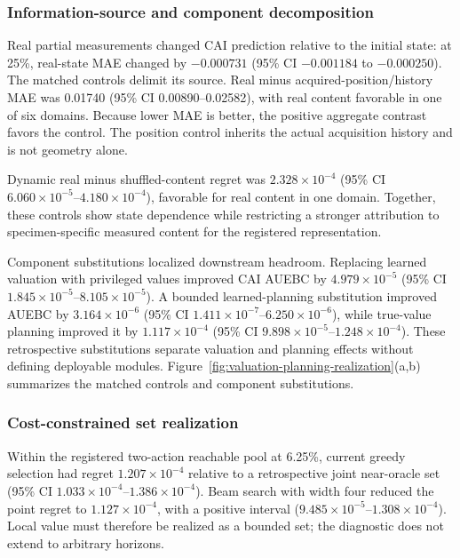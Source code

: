 \documentclass[preprint,12pt]{elsarticle}
\begin{document}
\subsubsection{Information-source and component decomposition}
\label{sec:results-decomposition}

Real partial measurements changed CAI prediction relative to the initial state:
at 25\%, real-state MAE changed by $-0.000731$ (95\% CI
$-0.001184$ to $-0.000250$). The matched controls delimit its source. Real
minus acquired-position/history MAE was 0.01740 (95\% CI 0.00890--0.02582),
with real content favorable in one of six domains. Because lower MAE is better,
the positive aggregate contrast favors the control. The position control
inherits the actual acquisition history and is not geometry alone.

Dynamic real minus shuffled-content regret was
$2.328\times10^{-4}$ (95\% CI
$6.060\times10^{-5}$--$4.180\times10^{-4}$), favorable for real content in one
domain. Together, these controls show state dependence while restricting a
stronger attribution to specimen-specific measured content for the registered
representation.

Component substitutions localized downstream headroom. Replacing learned
valuation with privileged values improved CAI AUEBC by
$4.979\times10^{-5}$ (95\% CI
$1.845\times10^{-5}$--$8.105\times10^{-5}$). A bounded learned-planning
substitution improved AUEBC by $3.164\times10^{-6}$ (95\% CI
$1.411\times10^{-7}$--$6.250\times10^{-6}$), while true-value planning
improved it by $1.117\times10^{-4}$ (95\% CI
$9.898\times10^{-5}$--$1.248\times10^{-4}$). These retrospective substitutions
separate valuation and planning effects without defining deployable modules.
Figure~\ref{fig:valuation-planning-realization}(a,b) summarizes the matched
controls and component substitutions.

\subsubsection{Cost-constrained set realization}
\label{sec:results-realization}

Within the registered two-action reachable pool at 6.25\%, current greedy
selection had regret $1.207\times10^{-4}$ relative to a retrospective joint
near-oracle set (95\% CI $1.033\times10^{-4}$--$1.386\times10^{-4}$).
Beam search with width four reduced the point regret to
$1.127\times10^{-4}$, with a positive interval
($9.485\times10^{-5}$--$1.308\times10^{-4}$). Local value must therefore be
realized as a bounded set; the diagnostic does not extend to arbitrary
horizons.
\end{document}
